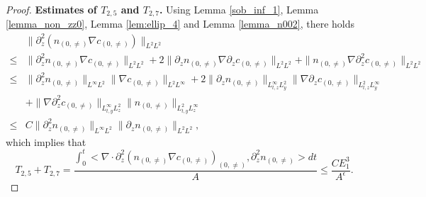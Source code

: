 \documentclass[12pt, reqno]{amsart}
\numberwithin{equation}{section}
\begin{document}
\begin{proof}
		{\bf Estimates of $T_{2,5}$ and $T_{2,7}$.} 
		Using Lemma \ref{sob_inf_1}, Lemma \ref{lemma_non_zz0}, Lemma \ref{lem:ellip_4}
		and Lemma \ref{lemma_n002}, there holds
		\begin{equation*}
			\begin{aligned}
				&\|\partial_z^2(n_{(0,\neq)}\nabla c_{(0,\neq)})\|_{L^2L^2}\\
				\leq&\|\partial_z^2n_{(0,\neq)}\nabla c_{(0,\neq)}\|_{L^2L^2}
				+2\|\partial_zn_{(0,\neq)}\nabla 	\partial_zc_{(0,\neq)}\|_{L^2L^2}
				+\|n_{(0,\neq)}\nabla \partial_z^2c_{(0,\neq)}\|_{L^2L^2}\\
				\leq&\|\partial_z^2n_{(0,\neq)}\|_{L^{\infty}L^2}\|\nabla 	c_{(0,\neq)}\|_{L^2L^{\infty}}
				+2\|\partial_zn_{(0,\neq)}\|_{L^{\infty}_{t,z}L^2_{y}}
				\|\nabla \partial_zc_{(0,\neq)}\|_{L^2_{t,z}L^{\infty}_y}\\
				&+\|\nabla \partial_z^2c_{(0,\neq)}\|_{L^{\infty}_{t,y}L^2_z}
				\|n_{(0,\neq)}\|_{L^{2}_{t,y}L^{\infty}_z}\\
				\leq &C\|\partial_z^2n_{(0,\neq)}\|_{L^{\infty}L^2}
				\|\partial_z n_{(0,\neq)}\|_{L^2L^{2}},
			\end{aligned}
		\end{equation*}
		which implies that 
		\begin{equation*}
			T_{2,5}+T_{2,7}
			=\frac{\int_0^t<\nabla\cdot\partial_z^2(n_{(0,\neq)}
				\nabla c_{(0,\neq)})_{(0,\neq)},\partial_z^2 n_{(0,\neq)}>dt}{A}
			\leq \frac{CE_1^3}{A^{\epsilon}}.
		\end{equation*}
		

\end{proof}
\end{document}
